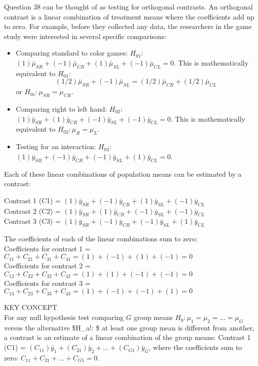 \documentclass[
]{report}
\providecommand{\tightlist}{%
  \setlength{\itemsep}{0pt}\setlength{\parskip}{0pt}}
\theoremstyle{definition}
\theoremstyle{definition}
\theoremstyle{definition}
\theoremstyle{definition}
\theoremstyle{remark}
\begin{document}
Question 38 can be thought of as testing for orthogonal contrasts. An orthogonal contrast is a linear combination of treatment means where the coefficients add up to zero. For example, before they collected any data, the researchers in the game study were interested in several specific comparisons:

\begin{itemize}
\tightlist
\item
  Comparing standard to color games: \(H_{01}:\) \((1)\bar \mu_{SR} + (-1)\bar \mu_{CR} + (1)\bar \mu_{SL} + (-1)\bar \mu_{CL} = 0\). This is mathematically equivalent to \(H_{01}:\) \[(1/2)\bar \mu_{SR} + (-1)\bar \mu_{SL} = (1/2)\bar \mu_{CR} + (1/2)\bar\mu_{CL} \] or \(H_{01}: \mu_{SR} = \mu_{CR}\).
\item
  Comparing right to left hand: \(H_{02}:\) \((1)\bar y_{SR} + (1)\bar y_{CR} + (-1)\bar y_{SL} + (-1)\bar y_{CL} = 0\). This is mathematically equivalent to \(H_{02}: \mu_{R} = \mu_{L}\).
\item
  Testing for an interaction: \(H_{03}:\) \((1)\bar y_{SR} + (-1)\bar y_{CR} + (-1)\bar y_{SL} + (1)\bar y_{CL} = 0\).
\end{itemize}

Each of these linear combinations of population means can be estimated by a contrast:

Contrast 1 (C1) = \((1)\bar y_{SR} + (-1)\bar y_{CR} + (1)\bar y_{SL} + (-1)\bar y_{CL}\)\\
Contrast 2 (C2) = \((1)\bar y_{SR} + (1)\bar y_{CR} + (-1)\bar y_{SL} + (-1)\bar y_{CL}\)\\
Contrast 3 (C3) = \((1)\bar y_{SR} + (-1)\bar y_{CR} + (-1)\bar y_{SL} + (1)\bar y_{CL}\)

The coefficients of each of the linear combinations sum to zero:\\
Coefficients for contrast 1 = \(C_{11} + C_{21} + C_{31} + C_{41} = (1) + (-1) + (1) + (-1) = 0\)\\
Coefficients for contrast 2 = \(C_{12} + C_{22} + C_{32} + C_{42} = (1) + (1) + (-1) + (-1) = 0\)\\
Coefficients for contrast 3 = \(C_{13} + C_{23} + C_{33} + C_{43} = (1) + (-1) + (-1) + (1) = 0\)

KEY CONCEPT\\
For any null hypothesis test comparing \(G\) group means \(H_0\!: \mu_1 = \mu_2 = \dots = \mu_G\) versus the alternative \$H\_a!: \$ at least one group mean is different from another, a contrast is an estimate of a linear combination of the group means: Contrast 1 (C1) = \((C_{11})\bar y_1 + (C_{21})\bar y_2 + \dots + (C_{G1})\bar y_G\), where the coefficients sum to zero: \(C_{11} + C_{21} + \dots + C_{G1} = 0\).
\end{document}
